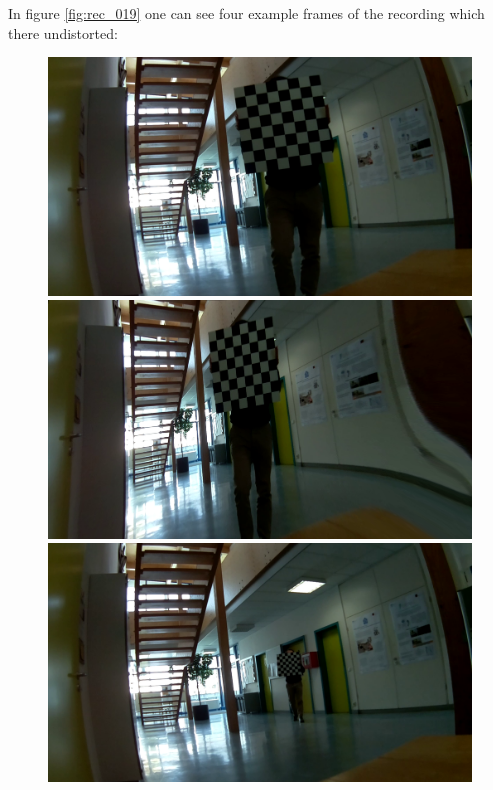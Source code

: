 In figure \ref{fig:rec_019} one can see four example frames of the recording which there undistorted:


\begin{figure}[H]
     \centering
     \captionsetup{justification=centering}
     \begin{minipage}[t]{0.24\textwidth}
        \centering
        \includegraphics[width=.95\textwidth]{image/3/rec_2/133_og.png}
     \end{minipage}%
     \begin{minipage}[t]{0.24\textwidth}
        \centering
        \includegraphics[width=.95\textwidth]{image/3/rec_2/133_undist.png}
     \end{minipage}
     \begin{minipage}[t]{0.24\textwidth}
        \centering
        \includegraphics[width=.95\textwidth]{image/3/rec_2/525_og.png}

\end{minipage}
\end{figure}
